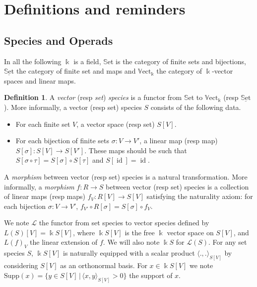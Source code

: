 \documentclass[a4paper]{article}
\DeclareMathOperator{\id}{id}
\theoremstyle{definition}
\newtheorem{definition}{Definition}
\begin{document}
\section{Definitions and reminders}

\subsection{Species and Operads}

In all the following $\Bbbk$ is a field, $\mathbb{S}$et is the category of finite sets and bijections, $\underline{\text{$\mathbb{S}$et}}$ the category of finite set and maps and $\mathbb{V}\text{ect}_{\Bbbk}$ the category of $\Bbbk$-vector spaces and linear maps.


\begin{definition}
A \textit{vector} (resp \textit{set}) \textit{species} is a functor from $\mathbb{S}$et to $\mathbb{V}\text{ect}_{\Bbbk}$ (resp $\underline{\text{$\mathbb{S}$et}}$).
More informally, a vector (resp set) species $S$ consists of the following data.
\begin{itemize}
\item For each finite set $V$, a vector space (resp set) $S[V]$.
\item For each bijection of finite sets $\sigma: V\rightarrow V'$, a linear map (resp map) $S[\sigma]:S[V]\rightarrow S[V']$. These maps should be such that $S[\sigma\circ\tau] = S[\sigma]\circ S[\tau]$ and $S[\id] = \id$.
\end{itemize}


A \textit{morphism} between vector (resp set) species is a natural transformation.
More informally, a \textit{morphism} $f: R\rightarrow S$ between vector (resp set) species is a collection of linear maps (resp maps) $f_V : R[V] \rightarrow S[V]$ satisfying the naturality axiom: for each bijection $\sigma: V\rightarrow V'$, $f_{V'}\circ R[\sigma] = S[\sigma]\circ f_V$.

We note $\mathcal{L}$ the functor from set species to vector species defined by $L(S)[V] = \Bbbk S[V]$, where $\Bbbk S[V]$ is the free $\Bbbk$ vector space on $S[V]$, and $L(f)_V$ the linear extension of $f$. We will also note $\Bbbk S$ for $\mathcal{L}(S)$.
For any set species $S$, $\Bbbk S[V]$ is naturally equipped with a scalar product $\langle ., .\rangle_{S[V]}$ by considering $S[V]$ as an orthonormal basis. For $x\in\Bbbk S[V]$ we note $\text{Supp}(x) = \{y\in S[V]\,|\, \langle x, y\rangle_{S[V]} > 0\}$ the support of $x$. 
\end{definition}
\end{document}
